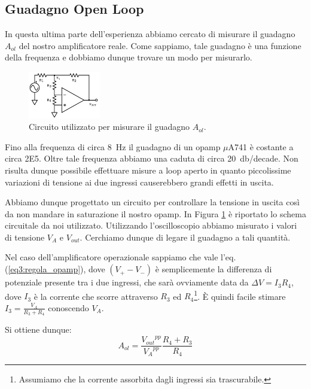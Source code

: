\subsection{Guadagno Open Loop}
\label{par3:open}

In questa ultima parte dell'esperienza abbiamo cercato di misurare il guadagno $A_{ol}$ del nostro amplificatore reale.
Come sappiamo, tale guadagno è una funzione della frequenza e dobbiamo dunque trovare un modo per misurarlo.



\begin{figure}
  \begin{center}
    \includegraphics[width=0.280\textwidth]{../E03/latex/LF_ol.pdf}
  \end{center}
  \caption{Circuito utilizzato per misurare il guadagno $A_{ol}$.}
  \label{cir3:low_frequency}
\end{figure}

Fino alla frequenza di circa \SI{8}{\hertz} il guadagno di un opamp $\mu$A741 è costante a circa \num{2E5}.
Oltre tale frequenza abbiamo una caduta di circa \SI{20}{\decibel}/decade.
Non risulta dunque possibile effettuare misure a loop aperto in quanto piccolissime variazioni di tensione ai due ingressi causerebbero grandi effetti in uscita.

Abbiamo dunque progettato un circuito per controllare la tensione in uscita così da non mandare in saturazione il nostro opamp.
In Figura \ref{cir3:low_frequency} è riportato lo schema circuitale da noi utilizzato.
Utilizzando l'oscilloscopio abbiamo misurato i valori di tensione $V_A$ e $V_{out}$. Cerchiamo dunque di legare il guadagno a tali quantità.

Nel caso dell'amplificatore operazionale sappiamo che vale l'eq. (\ref{eq3:regola_opamp}), dove $(V_+-V_-)$ è semplicemente la differenza di potenziale presente tra i due ingressi, che sarà ovviamente data da $\Delta V = I_3R_4$, dove $I_3$ è la corrente che scorre attraverso $R_3$ ed $R_4$\footnote{Assumiamo che la corrente assorbita dagli ingressi sia trascurabile.}.
È quindi facile stimare $I_3=\frac{V_A}{R_3+R_4}$ conoscendo $V_A$.

Si ottiene dunque:
\begin{equation}
A_{ol}=\frac{{V_{out}}^{pp}}{{V_A}^{pp}} \frac{R_4+R_3}{R_4}
\label{eq3:lfgain}
\end{equation}

